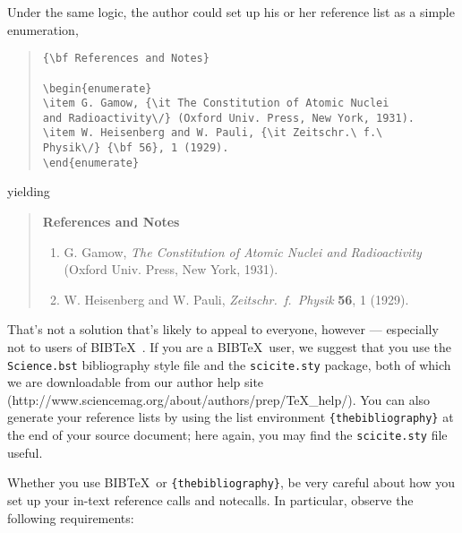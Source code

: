 \documentclass[letterpaper, 12pt]{article}
\begin{document}
{Under the same logic, the author could set up his or her reference list as a simple enumeration,

\begin{quote}
\begin{verbatim}
{\bf References and Notes}

\begin{enumerate}
\item G. Gamow, {\it The Constitution of Atomic Nuclei
and Radioactivity\/} (Oxford Univ. Press, New York, 1931).
\item W. Heisenberg and W. Pauli, {\it Zeitschr.\ f.\ 
Physik\/} {\bf 56}, 1 (1929).
\end{enumerate}
\end{verbatim}
\end{quote}

\noindent yielding

\begin{quote}
{\bf References and Notes}

\begin{enumerate}
\item G. Gamow, {\it The Constitution of Atomic Nuclei and
Radioactivity\/} (Oxford Univ. Press, New York, 1931).
\item W. Heisenberg and W. Pauli, {\it Zeitschr.\ f.\ Physik} {\bf 56},
1 (1929).
\end{enumerate}
\end{quote}

That's not a solution that's likely to appeal to everyone, however ---
especially not to users of B{\small{IB}}\TeX\ \cite{inclme}.  If you
are a B{\small{IB}}\TeX\ user, we suggest that you use the
\texttt{Science.bst} bibliography style file and the
\texttt{scicite.sty} package, both of which we are downloadable from our author help site
(http://www.sciencemag.org/about/authors/prep/TeX\_help/).  You can also
generate your reference lists by using the list environment
\texttt{\{thebibliography\}} at the end of your source document; here
again, you may find the \texttt{scicite.sty} file useful.

Whether you use B{\small{IB}}\TeX\ or \texttt{\{thebibliography\}}, be
very careful about how you set up your in-text reference calls and
notecalls.  In particular, observe the following requirements:

}
\end{document}
